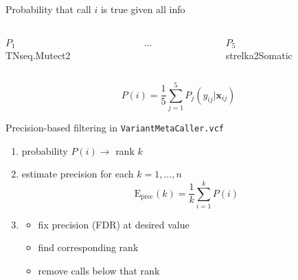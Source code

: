 \documentclass{beamer}
\begin{document}
\begin{frame}{Probability that call \(i\) is true given all info}
\begin{columns}[t]
\begin{column}{0.33\textwidth}

\begin{center}
\(P_1\)\\
TNseq.Mutect2
\end{center}
\end{column}

\begin{column}{0.33\textwidth}

\begin{center}
...
\end{center}

\end{column}

\begin{column}{0.33\textwidth}

\begin{center}
\(P_5\) \\
strelka2Somatic
\end{center}
\end{column}
\end{columns}
\vfill
\begin{center}
\[
P(i) = \frac{1}{5} \sum_{j=1}^5 P_j(y_{ij} | \mathbf{x}_{ij})
\]
\end{center}
\end{frame}

\begin{frame}{Precision-based filtering in \texttt{VariantMetaCaller.vcf}}
\begin{enumerate}
\item probability \(P(i) \rightarrow \) rank \(k\)
\item estimate precision for each \(k=1,...,n\)
\[
\mathrm{E}_\mathrm{prec}(k) = \frac{1}{k} \sum_{i=1}^k P(i)
\] 
\item
\begin{itemize}
\item fix precision (FDR) at desired value
\item find corresponding rank
\item remove calls below that rank 
\end{itemize}
\end{enumerate}
\end{frame}
\end{document}
